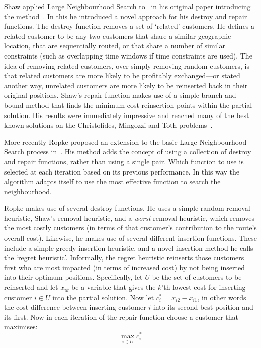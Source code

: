 Shaw applied Large Neighbourhood Search to \VRP\ in his original paper introducing the method~\cite{Shaw:1998}. In this he introduced a novel approach for his destroy and repair functions. The destroy function removes a set of `related' customers. He defines a related customer to be any two customers that share a similar geographic location, that are sequentially routed, or that share a number of similar constraints (such as overlapping time windows if time constraints are used). The idea of removing related customers, over simply removing random customers, is that related customers are more likely to be profitably exchanged---or stated another way, unrelated customers are more likely to be reinserted back in their original positions. Shaw's repair function makes use of a simple branch and bound method that finds the minimum cost reinsertion points within the partial solution. His results were immediately impressive and reached many of the best known solutions on the Christofides, Mingozzi and Toth problems~\cite{CMT:1981}.

More recently Ropke proposed an extension to the basic Large Neighbourhood Search process in~\cite{Ropke:2005}. His method adds the concept of using a collection of destroy and repair functions, rather than using a single pair. Which function to use is selected at each iteration based on its previous performance. In this way the algorithm adapts itself to use the most effective function to search the neighbourhood. 

Ropke makes use of several destroy functions. He uses a simple random removal heuristic, Shaw's removal heuristic, and a \emph{worst} removal heuristic, which removes the most costly customers (in terms of that customer's contribution to the route's overall cost). Likewise, he makes use of several different insertion functions. These include a simple greedy insertion heuristic, and a novel insertion method he calls the `regret heuristic'. Informally, the regret heuristic reinserts those customers first who are most impacted (in terms of increased cost) by not being inserted into their optimum positions. Specifically, let $U$ be the set of customers to be reinserted and let $x_{ik}$ be a variable that gives the $k$'th lowest cost for inserting customer $i \in U$ into the partial solution. Now let $c_i^* = x_{i2} - x_{i1}$, in other words the cost difference between inserting customer $i$ into its second best position and its first. Now in each iteration of the repair function choose a customer that maximises:
\[
   \operatorname*{max}_{i \in U} c_i^*
\]

